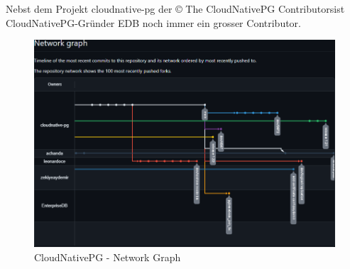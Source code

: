 \clearpage
\begin{flushleft}
    Nebst dem Projekt cloudnative-pg der \guillemotleft© The CloudNativePG Contributors\guillemotright ist CloudNativePG-Gründer EDB noch immer ein grosser Contributor.
     \begin{figure}[H]
        \centering
        \includegraphics[width=0.75\linewidth]{source/implementation/evaluation/postgresql_ha_solutions/insights/cloudnativepg/network_graph_cloudnative-pg_cloudnative-pg}
        \caption{CloudNativePG - Network Graph}
        \label{fig:network_graph_cloudnative-pg_cloudnative-pg}
    \end{figure}
\end{flushleft}